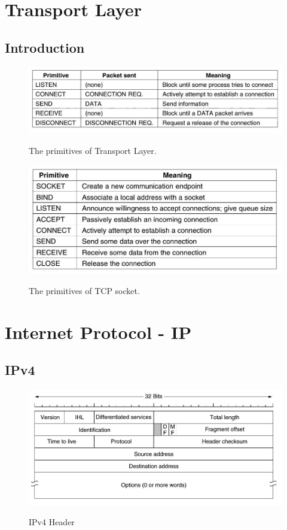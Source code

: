 \documentclass[a4paper,oneside]{book}
\begin{document}
\chapter{Transport Layer}
\section{Introduction}
\begin{figure}[H]
\caption{The primitives of Transport Layer.}
\includegraphics[scale=0.6]{Images/primitivestransport}
\label{fig:cn_primitives_transport_layer}
\end{figure}
\begin{figure}[H]
\caption{The primitives of TCP socket.}
\includegraphics[scale=0.6]{Images/tcpsocketprim}
\label{fig:cn_tcp_primitives}
\end{figure}
\chapter{Internet Protocol - IP}
\section{IPv4}
\begin{figure}[H]
\caption{IPv4 Header}
\includegraphics[scale=0.6]{Images/ipv4header}
\label{fig:cn_ipv4_head}
\end{figure}
\end{document}
